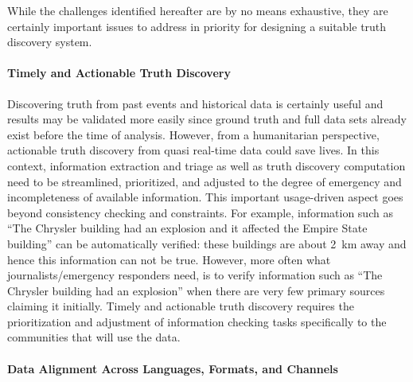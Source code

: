 \documentclass[prodmode,acmtecs]{acmsmall} %
\begin{document}
 While the challenges identified hereafter  are by no means exhaustive, they are certainly important issues to address in priority for 
 designing a suitable truth discovery system.


\paragraph*{Timely and Actionable Truth Discovery} 

Discovering truth from past events and historical data is certainly useful and results may be validated more easily since ground truth and full data sets already exist before the time of analysis. However, from a humanitarian perspective, actionable truth discovery from quasi real-time data could save lives. %
In this context, information extraction and triage as well as truth discovery computation need to be streamlined, prioritized,  and adjusted to the degree of emergency and incompleteness of available information. This important usage-driven aspect goes beyond consistency checking and constraints. For example, information such as ``The Chrysler building had an explosion and it affected the Empire State building'' can be automatically verified: these buildings are about 2~km away and hence this information can not be true. However, more often what journalists/emergency responders need, is to verify information such as ``The Chrysler building had an explosion'' when there are very few primary sources claiming it initially. Timely and actionable truth discovery requires the prioritization and adjustment of information checking tasks specifically to the communities that will use the data.
%

\paragraph*{Data Alignment Across Languages, Formats, and Channels} 
\end{document}
